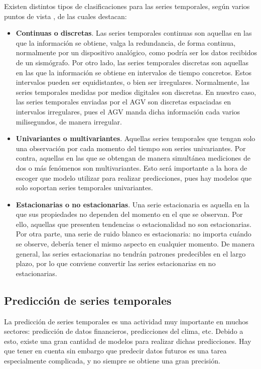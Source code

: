 Existen distintos tipos de clasificaciones para las series temporales, según varios puntos de vista \cite{kitagawa2010introduction}, de
las cuales destacan:
\begin{itemize}
    \item \textbf{Continuas o discretas}. Las series temporales continuas son aquellas en las que la información se obtiene, valga la redundancia,
        de forma continua, normalmente por un dispositivo analógico, como podría ser los datos recibidos de un sismógrafo. Por otro lado,
        las series temporales discretas son aquellas en las que la información se obtiene en intervalos de tiempo concretos. Estos intervalos 
        pueden ser equidistantes, o bien ser irregulares. Normalmente, las series temporales medidas por medios digitales son discretas.
        En nuestro caso, las series temporales enviadas por el AGV son discretas espaciadas en intervalos irregulares, pues el AGV manda dicha
        información cada varios milisegundos, de manera irregular.
    \item \textbf{Univariantes o multivariantes}. Aquellas series temporales que tengan solo una observación por cada momento del tiempo son series
        univariantes. Por contra, aquellas en las que se obtengan de manera simultánea mediciones de dos o más fenómenos son multivariantes.
        Esto será importante a la hora de escoger que modelo utilizar para realizar predicciones, pues hay modelos que solo soportan series
        temporales univariantes.
    \item \textbf{Estacionarias o no estacionarias}. Una serie estacionaria \cite{hyndman2018forecasting} es aquella en la que sus propiedades no dependen del momento
        en el que se observan. Por ello, aquellas que presenten tendencias o estacionalidad no son estacionarias. Por otra parte, una serie de 
        ruido blanco es estacionaria: no importa cuándo se observe, debería tener el mismo aspecto en cualquier momento. De manera general, las
        series estacionarias no tendrán patrones predecibles en el largo plazo, por lo que conviene convertir las series estacionarias en no
        estacionarias.
\end{itemize}

\subsection{Predicción de series temporales}

La predicción de series temporales es una actividad muy importante en muchos sectores: predicción 
de datos financieros, predicciones del clima, etc. Debido a esto, existe una gran cantidad de 
modelos para realizar dichas predicciones. Hay que tener en cuenta sin embargo que predecir 
datos futuros es una tarea especialmente complicada, y no siempre se obtiene una gran precisión.

